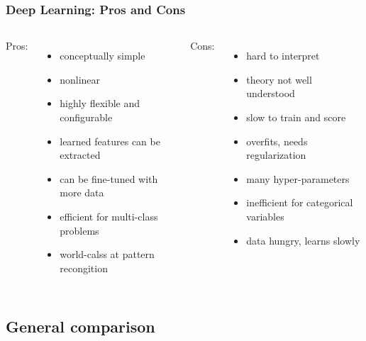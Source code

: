 \begin{frame}
  \MyLogo
  \frametitle{Deep Learning: Pros and Cons}  

\begin{columns}

{\color{blue}Pros:}
\begin{itemize}
\item conceptually simple
\item nonlinear 
\item highly flexible and configurable
\item learned features can be extracted
\item can be fine-tuned with more data
\item efficient for multi-class problems
\item world-calss at pattern recongition
\end{itemize}

{\color{red}Cons:}
\begin{itemize}
\item hard to interpret 
\item theory not well understood
\item slow to train and score
\item overfits, needs regularization
\item many hyper-parameters
\item inefficient for categorical variables
\item data hungry, learns slowly 
\end{itemize}

\end{columns}

\end{frame}

\subsection{General comparison}

